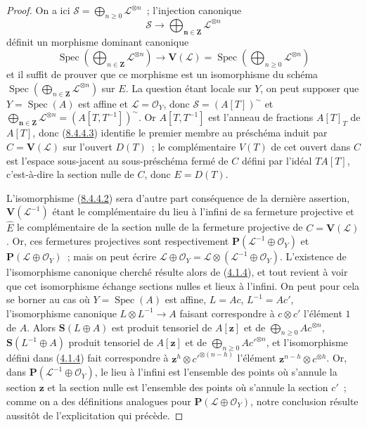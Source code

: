 \begin{proof}
On a ici
$\mathcal{S}=\bigoplus_{n\geq0}\mathcal{L}^{\otimes n}$~; l'injection
canonique
\[
  \mathcal{S}\to\bigoplus_{\boldsymbol{n}\in\mathbf{Z}}\mathcal{L}^{\otimes n}
\]
définit un morphisme dominant canonique
\begin{equation}
\label{II.8.4.4.3-fr}
  \operatorname{Spec}\left(
    \bigoplus_{n\in\mathbf{Z}}\mathcal{L}^{\otimes n}
  \right)
  \to\mathbf{V}(\mathcal{L})
  =\operatorname{Spec}\left(
    \bigoplus_{n\geq0}\mathcal{L}^{\otimes n}
  \right)
\tag{8.4.4.3}
\end{equation}
et il suffit de prouver que ce morphisme est un isomorphisme du schéma
$\operatorname{Spec}(\bigoplus_{n\in\mathbf{Z}}\mathcal{L}^{\otimes n})$
sur $E$. La question étant locale sur $Y$, on peut supposer que
$Y=\operatorname{Spec}(A)$ est affine
et $\mathcal{L}=\mathcal{O}_Y$, donc $\mathcal{S}=(A[T])^{\sim}$ et
$\bigoplus_{\boldsymbol{n}\in\mathbf{Z}}\mathcal{L}^{\otimes n}
=(A[T,T^{-1}])^{\sim}$. Or $A[T,T^{-1}]$ est l'anneau de fractions
$A[T]_T$ de $A[T]$, donc (\hyperref[II.8.4.4.3-fr]{8.4.4.3}) identifie le
premier membre au préschéma induit par $C=\mathbf{V}(\mathcal{L})$ sur
l'ouvert $D(T)$~; le complémentaire $V(T)$ de cet ouvert dans $C$ est
l'espace sous-jacent au sous-préschéma fermé de $C$ défini par l'idéal
$TA[T]$, c'est-à-dire la section nulle de $C$, donc $E=D(T)$.

L'isomorphisme (\hyperref[II.8.4.4.2-fr]{8.4.4.2}) sera d'autre part
conséquence de la dernière assertion, $\mathbf{V}(\mathcal{L}^{-1})$ étant le
complémentaire du lieu à l'infini de sa fermeture projective et $\widehat{E}$
le complémentaire de la section nulle de la fermeture projective de
$C=\mathbf{V}(\mathcal{L})$. Or, ces fermetures projectives sont
respectivement $\mathbf{P}(\mathcal{L}^{-1}\oplus\mathcal{O}_Y)$ et
$\mathbf{P}(\mathcal{L}\oplus\mathcal{O}_Y)$~; mais on peut écrire
$\mathcal{L}\oplus\mathcal{O}_Y
=\mathcal{L}\otimes(\mathcal{L}^{-1}\oplus\mathcal{O}_Y)$. L'existence de
l'isomorphisme canonique cherché résulte alors de
(\hyperref[II.4.1.4-fr]{4.1.4}), et tout revient à voir que cet isomorphisme
échange sections nulles et lieux à l'infini. On peut pour cela se borner au
cas où $Y=\operatorname{Spec}(A)$ est affine,
$L=Ac$, $L^{-1}=Ac'$, l'isomorphisme canonique
$L\otimes L^{-1}\to A$ faisant correspondre à $c\otimes c'$ l'élément $1$
de $A$. Alors $\mathbf{S}(L\oplus A)$ est produit tensoriel de $A[\mathbf{z}]$ et de
$\bigoplus_{n\geq0}Ac^{\otimes n}$, $\mathbf{S}(L^{-1}\oplus A)$ produit
tensoriel de $A[\mathbf{z}]$ et de $\bigoplus_{n\geq0}Ac'^{\otimes n}$, et
l'isomorphisme défini dans (\hyperref[II.4.1.4-fr]{4.1.4}) fait correspondre à
$\mathbf{z}^h\otimes c'^{\otimes(n-h)}$ l'élément
$\mathbf{z}^{n-h}\otimes c^{\otimes h}$. Or, dans
$\mathbf{P}(\mathcal{L}^{-1}\oplus\mathcal{O}_Y)$, le lieu à l'infini est
l'ensemble des points où s'annule la section $\mathbf{z}$ et la section nulle est
l'ensemble des points où s'annule la section $c'$~; comme on a des définitions
analogues pour $\mathbf{P}(\mathcal{L}\oplus\mathcal{O}_Y)$, notre conclusion
résulte aussitôt de l'explicitation qui précède.
\end{proof}

